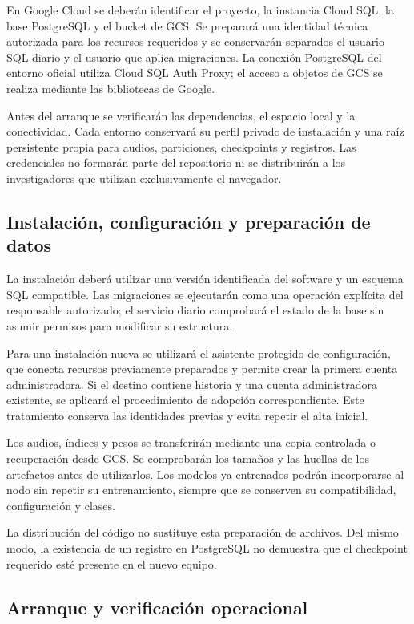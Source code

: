 En Google Cloud se deberán identificar el proyecto, la instancia Cloud SQL,
la base PostgreSQL y el bucket de GCS. Se preparará una identidad técnica
autorizada para los recursos requeridos y se conservarán separados el usuario
SQL diario y el usuario que aplica migraciones. La conexión PostgreSQL del
entorno oficial utiliza Cloud SQL Auth Proxy; el acceso a objetos de GCS se
realiza mediante las bibliotecas de Google.

Antes del arranque se verificarán las dependencias, el espacio local y la
conectividad. Cada entorno conservará su perfil privado de instalación y una
raíz persistente propia para audios, particiones, checkpoints y registros. Las
credenciales no formarán parte del repositorio ni se distribuirán a los
investigadores que utilizan exclusivamente el navegador.

\subsection{Instalación, configuración y preparación de datos}

La instalación deberá utilizar una versión identificada del software y un
esquema SQL compatible. Las migraciones se ejecutarán como una operación
explícita del responsable autorizado; el servicio diario comprobará el estado
de la base sin asumir permisos para modificar su estructura.

Para una instalación nueva se utilizará el asistente protegido de
configuración, que conecta recursos previamente preparados y permite crear la
primera cuenta administradora. Si el destino contiene historia y una cuenta
administradora existente, se aplicará el procedimiento de adopción
correspondiente. Este tratamiento conserva las identidades previas y evita
repetir el alta inicial.

Los audios, índices y pesos se transferirán mediante una copia controlada o
recuperación desde GCS. Se comprobarán los tamaños y las huellas de los
artefactos antes de utilizarlos. Los modelos ya entrenados podrán incorporarse
al nodo sin repetir su entrenamiento, siempre que se conserven su
compatibilidad, configuración y clases.

La distribución del código no sustituye esta preparación de archivos. Del
mismo modo, la existencia de un registro en PostgreSQL no demuestra que el
checkpoint requerido esté presente en el nuevo equipo.

\subsection{Arranque y verificación operacional}

